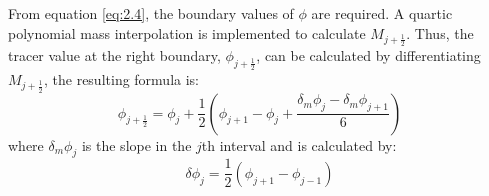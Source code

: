 From equation \ref{eq:2.4}, the boundary values of $\phi$ are required. A quartic polynomial mass interpolation \citep{Colella1984} is implemented to calculate $M_{j+\frac{1}{2}}$. Thus, the tracer value at the right boundary, $\phi_{j+\frac{1}{2}}$, can be calculated by differentiating $M_{j+\frac{1}{2}} $, the resulting formula is:
\begin{equation} \label{eq:2.5} 
\phi_{j+\frac{1}{2}} = \phi_j + \frac{1}{2}(\phi_{j+1}-\phi_{j}+\frac{\delta_m \phi_j - \delta_m \phi_{j+1}}{6}) 
\end{equation} 
where $\delta_m \phi_j$ is the slope in the $j$th interval and is calculated by:
\begin{equation}
\delta \phi_j = \frac{1}{2}(\phi_{j+1} - \phi_{j-1})
\end{equation}


